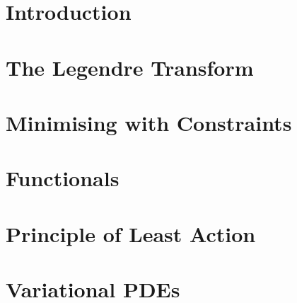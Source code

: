 \documentclass[british,11pt,a4paper]{report}
\begin{document}
\maketitle
\tableofcontents
\chapter{Introduction}

\chapter{The Legendre Transform}

\chapter{Minimising with Constraints}

\chapter{Functionals}

\chapter{Principle of Least Action}

\chapter{Variational PDEs}

\end{document}
